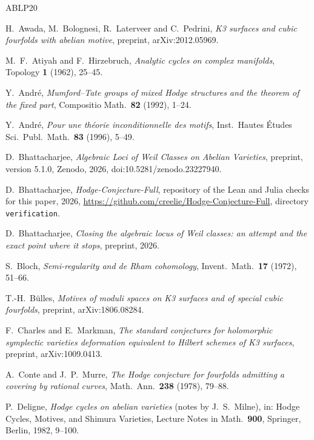 \documentclass[11pt]{amsart}
\theoremstyle{definition}
\theoremstyle{remark}
\begin{document}
\begin{thebibliography}{ABLP20}

H.~Awada, M.~Bolognesi, R.~Laterveer and C.~Pedrini, \emph{K3 surfaces and
cubic fourfolds with abelian motive}, preprint, arXiv:2012.05969.

M.~F.~Atiyah and F.~Hirzebruch, \emph{Analytic cycles on complex manifolds},
Topology \textbf{1} (1962), 25--45.

Y.~Andr\'e, \emph{Mumford--Tate groups of mixed Hodge structures and the
theorem of the fixed part}, Compositio Math.\ \textbf{82} (1992), 1--24.

Y.~Andr\'e, \emph{Pour une th\'eorie inconditionnelle des motifs}, Inst.\
Hautes \'Etudes Sci.\ Publ.\ Math.\ \textbf{83} (1996), 5--49.

D.~Bhattacharjee, \emph{Algebraic Loci of Weil Classes on Abelian
Varieties}, preprint, version 5.1.0, Zenodo, 2026,
doi:10.5281/zenodo.23227940.

D.~Bhattacharjee, \emph{Hodge-Conjecture-Full}, repository of the Lean and
Julia checks for this paper, 2026,
\url{https://github.com/creelie/Hodge-Conjecture-Full}, directory
\texttt{verification}.

D.~Bhattacharjee, \emph{Closing the algebraic locus of Weil classes: an
attempt and the exact point where it stops}, preprint, 2026.

S.~Bloch, \emph{Semi-regularity and de Rham cohomology}, Invent.\ Math.\
\textbf{17} (1972), 51--66.

T.-H.~B\"ulles, \emph{Motives of moduli spaces on K3 surfaces and of special
cubic fourfolds}, preprint, arXiv:1806.08284.

F.~Charles and E.~Markman, \emph{The standard conjectures for holomorphic
symplectic varieties deformation equivalent to Hilbert schemes of K3
surfaces}, preprint, arXiv:1009.0413.

A.~Conte and J.~P.~Murre, \emph{The Hodge conjecture for fourfolds admitting
a covering by rational curves}, Math.\ Ann.\ \textbf{238} (1978), 79--88.

\bibitem[Del82]{Del82}
P.~Deligne, \emph{Hodge cycles on abelian varieties} (notes by J.~S.~Milne),
in: Hodge Cycles, Motives, and Shimura Varieties, Lecture Notes in Math.\
\textbf{900}, Springer, Berlin, 1982, 9--100.


\end{thebibliography}
\end{document}
